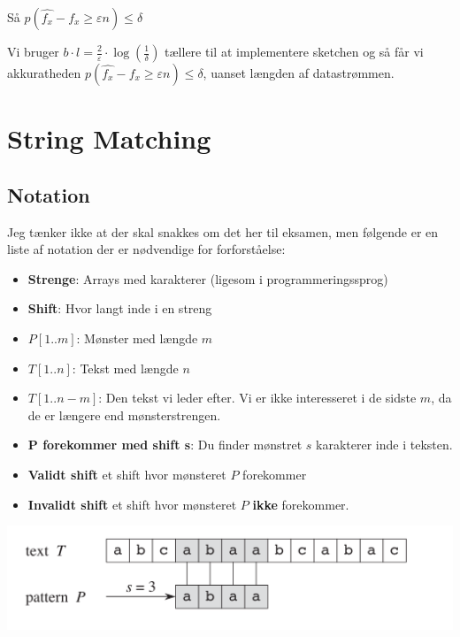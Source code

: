 \documentclass[11pt]{article}
\theoremstyle{definition}
\theoremstyle{remark}
\begin{document}
Så $p(\hat{f_{x}} - f_{x} \geq \varepsilon n) \leq \delta$

Vi bruger $b \cdot l = \frac{2}{\varepsilon} \cdot \log \left( \frac{1}{\delta} \right)$ tællere til at implementere sketchen og så får vi akkuratheden $p(\hat{f_{x}} - f_{x} \geq \varepsilon n) \leq \delta$, uanset længden af datastrømmen.

\newpage

\section{String Matching}
\label{sec:string}

\subsection{Notation}
\label{subsec:stringnotation}

Jeg tænker ikke at der skal snakkes om det her til eksamen, men følgende er en liste af notation der er nødvendige for  forforståelse:

\begin{itemize}
\item \textbf{Strenge}: Arrays med karakterer (ligesom i programmeringssprog)
\item \textbf{Shift}: Hvor langt inde i en streng
\item $P[1..m]$: Mønster med længde $m$
\item $T[1..n]$: Tekst med længde $n$
\item $T[1..n-m]$: Den tekst vi leder efter. Vi er ikke interesseret i de sidste $m$, da de er længere end mønsterstrengen.
\item \textbf{P forekommer med shift s}: Du finder mønstret $s$ karakterer inde i teksten.
\item \textbf{Validt shift} et shift hvor mønsteret $P$ forekommer
\item \textbf{Invalidt shift} et shift hvor mønsteret $P$ \textbf{ikke} forekommer. 
\end{itemize}
\includegraphics[width=400pt]{main--string-matching--notation-81a7.png}
\end{document}
